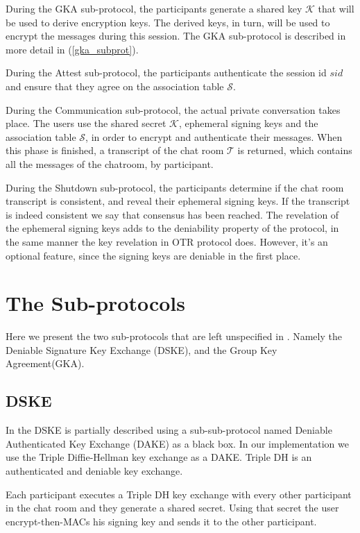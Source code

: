 \documentclass[]{article}
\begin{document}
During the GKA sub-protocol, the participants generate a shared key $\mathcal{K}$ that will be used to derive encryption keys.
The derived keys, in turn, will be used to encrypt the messages during this session.
The GKA sub-protocol is described in more detail in (\ref{gka_subprot}).

During the Attest sub-protocol, the participants authenticate the session id $sid$ and ensure that they agree on the association table $\mathcal{S}$.

During the Communication sub-protocol, the actual private conversation takes place.
The users use the shared secret $\mathcal{K}$, ephemeral signing keys and the association table $\mathcal{S}$, in order to encrypt and authenticate their messages.
When this phase is finished, a transcript of the chat room $\mathcal{T}$ is returned, which contains all the messages of the chatroom, by participant.

During the Shutdown sub-protocol, the participants determine if the chat room transcript is consistent, and reveal their ephemeral signing keys.
If the transcript is indeed consistent we say that consensus has been reached.
The revelation of the ephemeral signing keys adds to the deniability property of the protocol, in the same manner the key revelation in OTR protocol does.
However, it's an optional feature, since the signing keys are deniable in the first place.

\section{The Sub-protocols}

Here we present the two sub-protocols that are left unspecified in \cite{mpotr}.
Namely the Deniable Signature Key Exchange (DSKE), and the Group Key Agreement(GKA).

\subsection{DSKE}
\label{dske_subprot}

In \cite{mpotr} the DSKE is partially described using a sub-sub-protocol named Deniable Authenticated Key Exchange (DAKE) as a black box.
In our implementation we use the Triple Diffie-Hellman key exchange as a DAKE.
Triple DH is an authenticated and deniable key exchange.

Each participant executes a Triple DH key exchange with every other participant in the chat room and they generate a shared secret.
Using that secret the user encrypt-then-MACs his signing key and sends it to the other participant.
\end{document}
